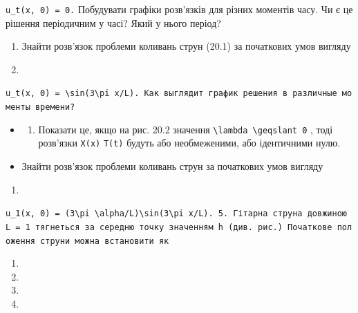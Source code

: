 \documentclass[
  ukrainian,
]{article}
\providecommand{\tightlist}{%
  \setlength{\itemsep}{0pt}\setlength{\parskip}{0pt}}
\begin{document}
\texttt{u\_t(x,\ 0)\ =\ 0.} Побудувати графіки розв'язків для різних
моментів часу. Чи є це рішення періодичним у часі? Який у нього період?

\begin{enumerate}
\def\labelenumi{\arabic{enumi}.}
\setcounter{enumi}{1}
\item
  Знайти розв'язок проблеми коливань струн (20.1) за початкових умов
  вигляду
\item
\end{enumerate}

\texttt{\textquotesingle{}u\_t(x,\ 0)\ =\ \textbackslash{}sin(3\textbackslash{}pi\ x/L).\textquotesingle{}\ Как\ выглядит\ график\ решения\ в\ различные\ моменты\ времени?}

\begin{itemize}
\tightlist
\item
  \begin{enumerate}
  \def\labelenumi{\arabic{enumi}.}
  \setcounter{enumi}{2}
  \tightlist
  \item
    Показати це, якщо на рис. 20.2 значення
    \texttt{\textbackslash{}lambda\ \textbackslash{}geqslant\ 0} , тоді
    розв'язки \texttt{X(x)} \texttt{T(t)} будуть або необмеженими, або
    ідентичними нулю.
  \end{enumerate}
\item
  Знайти розв'язок проблеми коливань струн за початкових умов вигляду
\end{itemize}

\begin{enumerate}
\def\labelenumi{\arabic{enumi}.}
\setcounter{enumi}{11}
\tightlist
\item
\end{enumerate}

\texttt{\textquotesingle{}u\_1(x,\ 0)\ =\ (3\textbackslash{}pi\ \textbackslash{}alpha/L)\textbackslash{}sin(3\textbackslash{}pi\ x/L).\textquotesingle{}\ 5.\ Гітарна\ струна\ довжиною\ L\ =\ 1\ тягнеться\ за\ середню\ точку\ значенням\ h\ (див.\ рис.)\ Початкове\ положення\ струни\ можна\ встановити\ як}

\begin{enumerate}
\def\labelenumi{\arabic{enumi}.}
\setcounter{enumi}{12}
\tightlist
\item
\item
\item
\item
\end{enumerate}
\end{document}
